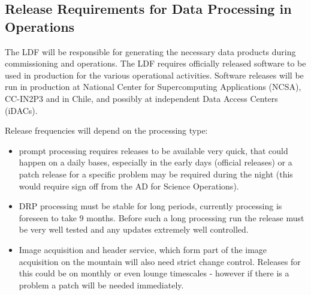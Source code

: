 %


\subsection{Release Requirements for Data Processing in Operations} \label{sec:procreqs}

The \gls{LDF} will be responsible for generating the necessary data products during commissioning and operations. 
The \gls{LDF} requires officially released software to be used in production for the various operational activities.
Software releases will be run in production at National \gls{Center} for Supercomputing Applications (\gls{NCSA}), CC-IN2P3 and in Chile, and possibly at independent Data Access Centers (iDACs).

Release frequencies will depend on the processing type:
\begin{itemize}
\item prompt processing requires releases to be available very quick, that could happen on a daily bases, especially in the early days (official releases)
 or a  \gls{patch} release  for a specific problem may be required during the night (this would require sign off from the \gls{AD} for Science \gls{Operations}).
\item \gls{DRP} processing  must be stable for long periods, currently processing is foreseen to take 9 months.  Before such a long processing run the release must be very well tested and any updates extremely well controlled.
\item Image acquisition and header service, which form part of the image acquisition on the mountain will also need strict change control. Releases for this could be on monthly or even lounge timescales - however if there is a problem a \gls{patch} will be needed immediately.
\end{itemize}

